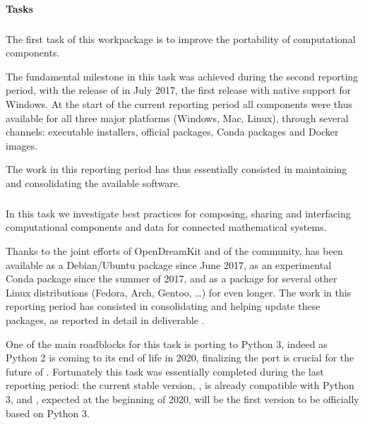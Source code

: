 \paragraph{Tasks}

  \subparagraph{}
  \label{component-architecture@portability}
  The first task of this workpackage is to improve the portability of
  computational components.

  The fundamental milestone in this task was achieved during the
  second reporting period, with the release of  in July 2017,
  the first release with native support for Windows. At the start of
  the current reporting period all \ODK components were thus available
  for all three major platforms (Windows, Mac, Linux), through several
  channels: executable installers, official packages, Conda packages
  and Docker images.

  The work in this reporting period has thus essentially consisted in
  maintaining and consolidating the available software.

  \subparagraph{}
  \label{component-architecture@interface-systems}
  
  \subparagraph{}
  \label{component-architecture@mod-packaging}
  In this task we investigate best practices for composing, sharing
  and interfacing computational components and data for connected
  mathematical systems.

  Thanks to the joint efforts of OpenDreamKit and of the community,
  \Sage has been available as a Debian/Ubuntu package since June 2017,
  as an experimental Conda package since the summer of 2017, and as a
  package for several other Linux distributions (Fedora, Arch, Gentoo,
  \dots) for even longer. The work in this reporting period has
  consisted in consolidating and helping update these packages, as
  reported in detail in deliverable
  .

  One of the main roadblocks for this task is porting \Sage to Python
  3, indeed as Python 2 is coming to its end of life in 2020,
  finalizing the port is crucial for the future of \Sage. Fortunately
  this task was essentially completed during the last reporting
  period: the current stable version, , is already compatible
  with Python 3, and , expected at the beginning of 2020,
  will be the first \Sage version to be officially based on Python 3.

